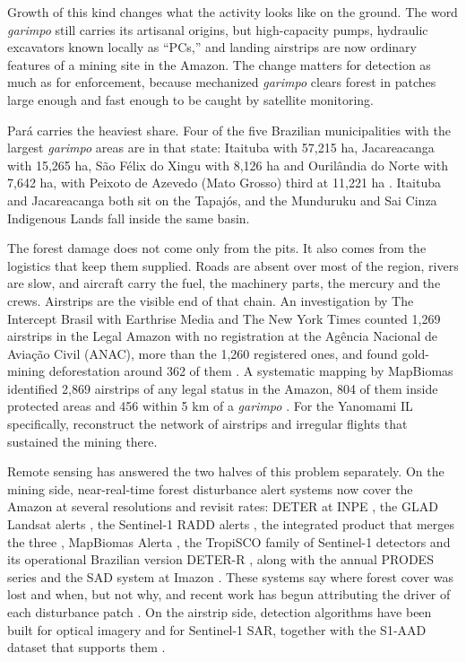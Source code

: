 \documentclass[11pt]{article}
\begin{document}
Growth of this kind changes what the activity looks like on the ground. The word \textit{garimpo} still carries its artisanal origins, but high-capacity pumps, hydraulic excavators known locally as ``PCs,'' and landing airstrips are now ordinary features of a mining site in the Amazon. The change matters for detection as much as for enforcement, because mechanized \textit{garimpo} clears forest in patches large enough and fast enough to be caught by satellite monitoring.

Par\'a carries the heaviest share. Four of the five Brazilian municipalities with the largest \textit{garimpo} areas are in that state: Itaituba with 57{,}215 ha, Jacareacanga with 15{,}265 ha, S\~ao F\'elix do Xingu with 8{,}126 ha and Ouril\^andia do Norte with 7{,}642 ha, with Peixoto de Azevedo (Mato Grosso) third at 11{,}221 ha \citep{mapbiomas2022mineracao}. Itaituba and Jacareacanga both sit on the Tapaj\'os, and the Munduruku and Sai Cinza Indigenous Lands fall inside the same basin.

The forest damage does not come only from the pits. It also comes from the logistics that keep them supplied. Roads are absent over most of the region, rivers are slow, and aircraft carry the fuel, the machinery parts, the mercury and the crews. Airstrips are the visible end of that chain. An investigation by The Intercept Brasil with Earthrise Media and The New York Times counted 1{,}269 airstrips in the Legal Amazon with no registration at the Ag\^encia Nacional de Avia\c{c}\~ao Civil (ANAC), more than the 1{,}260 registered ones, and found gold-mining deforestation around 362 of them \citep{intercept2022}. A systematic mapping by MapBiomas identified 2{,}869 airstrips of any legal status in the Amazon, 804 of them inside protected areas and 456 within 5 km of a \textit{garimpo} \citep{mapbiomas2023pistas}. For the Yanomami IL specifically, \citet{furtado2024} reconstruct the network of airstrips and irregular flights that sustained the mining there.

Remote sensing has answered the two halves of this problem separately. On the mining side, near-real-time forest disturbance alert systems now cover the Amazon at several resolutions and revisit rates: DETER at INPE \citep{diniz2015}, the GLAD Landsat alerts \citep{hansen2016}, the Sentinel-1 RADD alerts \citep{reiche2021}, the integrated product that merges the three \citep{reiche2024}, MapBiomas Alerta \citep{mapbiomasalerta}, the TropiSCO family of Sentinel-1 detectors \citep{bouvet2018,ballere2021,mermoz2021} and its operational Brazilian version DETER-R \citep{doblas2024}, along with the annual PRODES series \citep{valeriano2004,assis2019} and the SAD system at Imazon \citep{imazonsad}. These systems say where forest cover was lost and when, but not why, and recent work has begun attributing the driver of each disturbance patch \citep{slagter2023,slagter2026}. On the airstrip side, detection algorithms have been built for optical imagery \citep{pardini2024,pardini2025} and for Sentinel-1 SAR, together with the S1-AAD dataset that supports them \citep{gomes2023,gomes2026}.
\end{document}
